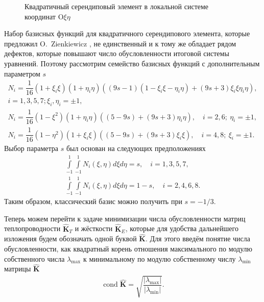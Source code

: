 \begin{figure}[ht]
    \caption{Квадратичный серендиповый элемент в локальной системе координат $\text{O}\xi\eta$}\label{fig:QuadraticSerendipity}
\end{figure}

Набор базисных функций для квадратичного серендипового элемента, которые предложил O.~Zienkiewicz \cite{Zienkiewicz}, не единственный и к тому же обладает рядом дефектов, которые повышают число обусловленности итоговой системы уравнений. Поэтому рассмотрим семейство базисных функций с дополнительным параметром $s$ \cite{QuadraticSerensipity}
\begin{gather*}
    N_i = \dfrac{1}{16} (1 + \xi_i \xi) (1 + \eta_i \eta) ((9s - 1) (1 - \xi_i \xi - \eta_i \eta) + (9s + 3) \xi_i \xi \eta_i \eta), \\ 
    i = 1, 3, 5, 7; \xi_i, \eta_i = \pm 1, \\
    N_i = \dfrac{1}{16} (1 - \xi^2) (1 + \eta_i \eta) ((5 - 9s) + (9s + 3)\eta_i \eta),
    \quad
    i = 2, 6; \ \eta_i = \pm 1, \\
    N_i = \dfrac{1}{16} (1 - \eta^2) (1 + \xi_i \xi) ((5 - 9s) + (9s + 3)\xi_i \xi),
    \quad
    i = 4, 8; \ \xi_i = \pm 1.
\end{gather*}
Выбор параметра $s$ был основан на следующих предположениях
\begin{gather*}
    \int\limits_{-1}^{1} \int\limits_{-1}^{1} N_i (\xi, \eta) d\xi d\eta = s,
    \quad
    i = 1, 3, 5, 7, \\
    \int\limits_{-1}^{1} \int\limits_{-1}^{1} N_i (\xi, \eta) d\xi d\eta = 1 - s,
    \quad
    i = 2, 4, 6, 8.
\end{gather*}
Таким образом, классический базис можно получить при $s = -1 / 3$.

Теперь можем перейти к задаче минимизации числа обусловленности матриц теплопроводности $\widehat{\textbf{K}}_T$ и жёсткости $\widehat{\textbf{K}}_E$, которые для удобства дальнейшего изложения будем обозначать одной буквой $\widehat{\textbf{K}}$. Для этого введём понятие числа обусловленности, как квадратный корень отношения максимального по модулю собственного числа $\lambda_{\max}$ к минимальному по модулю собственному числу $\lambda_{\min}$ матрицы $\widehat{\textbf{K}}$
\begin{gather}
	\label{eq:CondValue}
	\operatorname{cond} \widehat{\textbf{K}} = \sqrt{\dfrac{|\lambda_{\max}|}{|\lambda_{\min}|}}.
\end{gather}


